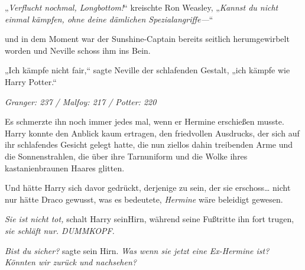 „\emph{Verflucht nochmal, Longbottom!}“ kreischte Ron Weasley, „\emph{Kannst du nicht einmal kämpfen, ohne deine dämlichen Spezialangriffe—}“

und in dem Moment war der Sunshine-Captain bereits seitlich herumgewirbelt worden und Neville schoss ihm ins Bein.

„Ich kämpfe nicht fair,“ sagte Neville der schlafenden Gestalt, „ich kämpfe wie Harry Potter.“

\later

\emph{Granger: 237 / Malfoy: 217 / Potter: 220}

Es schmerzte ihn noch immer jedes mal, wenn er Hermine erschießen musste. Harry konnte den Anblick kaum ertragen, den friedvollen Ausdrucks, der sich auf ihr schlafendes Gesicht gelegt hatte, die nun ziellos dahin treibenden Arme und die Sonnenstrahlen, die über ihre Tarnuniform und die Wolke ihres kastanienbraunen Haares glitten.

Und hätte Harry sich davor gedrückt, derjenige zu sein, der sie erschoss… nicht nur hätte Draco gewusst, was es bedeutete, \emph{Hermine} wäre beleidigt gewesen.

\emph{Sie ist nicht tot,} schalt Harry seinHirn, während seine Fußtritte ihn fort trugen, \emph{sie schläft nur. DUMMKOPF.}

\emph{Bist du sicher?} sagte sein Hirn. \emph{Was wenn sie jetzt eine Ex-Hermine ist? Könnten wir zurück und nachsehen?}%

